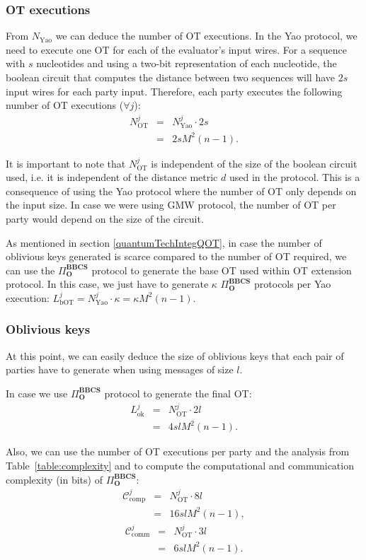 \subsubsection{OT executions}
From $N_{\text{Yao}}$ we can deduce the number of OT executions. In the Yao protocol, we need to execute one OT for each of the evaluator's input wires. For a sequence with $s$ nucleotides and using a two-bit representation of each nucleotide, the boolean circuit that computes the distance between two sequences will have $2s$ input wires for each party input. Therefore, each party executes the following number of OT executions ($\forall j$):
\begin{eqnarray*}
N_{\text{OT}}^j &=& N^j_\text{Yao} \cdot 2s \\
&=& 2sM^2(n-1).
\end{eqnarray*}

It is important to note that $N_{\text{OT}}^j$ is independent of the size of the boolean circuit used, i.e. it is independent of the distance metric $d$ used in the protocol. This is a consequence of using the Yao protocol where the number of OT only depends on the input size. In case we were using GMW \cite{Goldreich87} protocol, the number of OT per party would depend on the size of the circuit.

As mentioned in section \ref{quantumTechIntegQOT}, in case the number of oblivious keys generated is scarce compared to the number of OT required, we can use the $\Pi^{\textbf{BBCS}}_{\textbf{O}}$ protocol to generate the base OT used within OT extension protocol. In this case, we just have to generate $\kappa$ $\Pi^{\textbf{BBCS}}_{\textbf{O}}$ protocols per Yao execution: $L^j_\text{bOT} = N^j_\text{Yao} \cdot \kappa = \kappa M^2(n-1)$.

\subsubsection{Oblivious keys}
At this point, we can easily deduce the size of oblivious keys that each pair of parties have to generate when using messages of size $l$. 

In case we use $\Pi^{\textbf{BBCS}}_{\textbf{O}}$ protocol to generate the final OT:
\begin{eqnarray*}
L^j_{\text{ok}} &=& N_{\text{OT}}^j \cdot 2l \\
&=& 4slM^2(n-1).
\end{eqnarray*}

Also, we can use the number of OT executions per party and the analysis from Table~\ref{table:complexity} and \cite{Santos2021} to compute the computational and communication complexity (in bits) of $\Pi^{\textbf{BBCS}}_{\textbf{O}}$:
\begin{eqnarray*}
\mathcal{C}^j_{\text{comp}} &=&  N_{\text{OT}}^j \cdot 8l \\
&=& 16 slM^2(n-1),
\end{eqnarray*}
\begin{eqnarray*}
\mathcal{C}^j_{\text{comm}} &=&  N_{\text{OT}}^j \cdot 3l \\
&=& 6 slM^2(n-1).
\end{eqnarray*}

